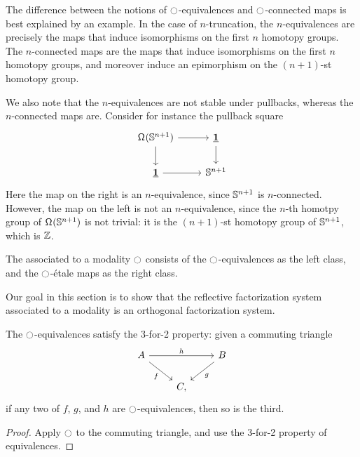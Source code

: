 \documentclass[9pt,twosided]{amsart}
\begin{document}
\begin{rmk}
The difference between the notions of ${\ocircle}$-equivalences and ${\ocircle}$-connected maps is best explained by an example. In the case of $n$-truncation, the $n$-equivalences are precisely the maps that induce isomorphisms on the first $n$ homotopy groups. The $n$-connected maps are the maps that induce isomorphisms on the first $n$ homotopy groups, and moreover induce an epimorphism on the $(n+1)$-st homotopy group. 

We also note that the $n$-equivalences are not stable under pullbacks, whereas the $n$-connected maps are. Consider for instance the pullback square
\begin{equation*}
\begin{tikzcd}
\loopspace {\sphere{n+1}} \arrow[r] \arrow[d] & \unit \arrow[d] \\
\unit\arrow[r] & \sphere{n+1}
\end{tikzcd}
\end{equation*}
Here the map on the right is an $n$-equivalence, since $\mathbb{S}^{n+1}$ is $n$-connected. However, the map on the left is not an $n$-equivalence, since the $n$-th homotpy group of $\mathsf{\Omega}^{}(\mathbb{S}^{n+1})$ is not trivial: it is the $(n+1)$-st homotopy group of $\mathbb{S}^{n+1}$, which is $\mathbb{Z}$.
\end{rmk}

\begin{defn}
The  associated to a modality ${\ocircle}$ consists of the ${\ocircle}$-equivalences as the left class, and the ${\ocircle}$-\'etale maps as the right class.
\end{defn}

Our goal in this section is to show that the reflective factorization system associated to a modality is an orthogonal factorization system.

\begin{lem}\label{lem:3for2_mequiv}
The ${\ocircle}$-equivalences satisfy the 3-for-2 property: given a commuting triangle
\begin{equation*}
\begin{tikzcd}
A \arrow[rr,"h"] \arrow[dr,swap,"f"] & & B \arrow[dl,"g"] \\
& C,
\end{tikzcd}
\end{equation*}
if any two of $f$, $g$, and $h$ are ${\ocircle}$-equivalences, then so is the third.
\end{lem}

\begin{proof}
Apply ${\ocircle}$ to the commuting triangle, and use the 3-for-2 property of equivalences.
\end{proof}
\end{document}
